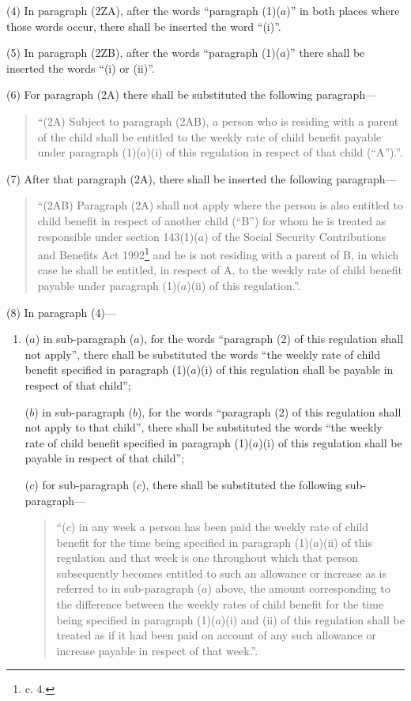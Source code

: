 \documentclass[a4paper]{article}
\newcommand\fnote[1]{\footnote{\frenchspacing #1}}
\begin{document}
(4) In paragraph (2ZA), after the words “paragraph (1)($a$)” in both places where those words occur, there shall be inserted the word “(i)”.

(5) In paragraph (2ZB), after the words “paragraph (1)($a$)” there shall be inserted the words “(i) or (ii)”.

(6) For paragraph (2A) there shall be substituted the following paragraph—
\begin{quotation}
“(2A) Subject to paragraph (2AB), a person who is residing with a parent of the child shall be entitled to the weekly rate of child benefit payable under paragraph (1)($a$)(i) of this regulation in respect of that child (“A”).”.
\end{quotation}

(7) After that paragraph (2A), there shall be inserted the following paragraph—
\begin{quotation}
“(2AB) Paragraph (2A) shall not apply where the person is also entitled to child benefit in respect of another child (“B”) for whom he is treated as responsible under section 143(1)($a$) of the Social Security Contributions and Benefits Act 1992\fnote{1992 c. 4.} and he is not residing with a parent of B, in which case he shall be entitled, in respect of A, to the weekly rate of child benefit payable under paragraph (1)($a$)(ii) of this regulation.”.
\end{quotation}

(8) In paragraph (4)—
\begin{enumerate}\item[]
($a$) in sub-paragraph ($a$), for the words “paragraph (2) of this regulation shall not apply”, there shall be substituted the words “the weekly rate of child benefit specified in paragraph (1)($a$)(i) of this regulation shall be payable in respect of that child”;

($b$) in sub-paragraph ($b$), for the words “paragraph (2) of this regulation shall not apply to that child”, there shall be substituted the words “the weekly rate of child benefit specified in paragraph (1)($a$)(i) of this regulation shall be payable in respect of that child”;

($c$) for sub-paragraph ($c$), there shall be substituted the following sub-paragraph—
\begin{quotation}
“($c$) in any week a person has been paid the weekly rate of child benefit for the time being specified in paragraph (1)($a$)(ii) of this regulation and that week is one throughout which that person subsequently becomes entitled to such an allowance or increase as is referred to in sub-paragraph ($a$) above, the amount corresponding to the difference between the weekly rates of child benefit for the time being specified in paragraph (1)($a$)(i) and (ii) of this regulation shall be treated as if it had been paid on account of any such allowance or increase payable in respect of that week.”.
\end{quotation}
\end{enumerate}
\end{document}
